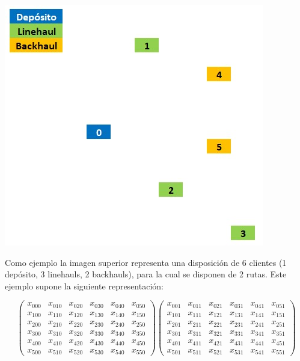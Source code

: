 \documentclass[letter, 10pt]{article}
\begin{document}
\begin{center}
\includegraphics[scale=0.5]{Instancia inicial.jpg}
\end{center}

Como ejemplo la imagen superior representa una disposición de $6$ clientes (1 depósito, 3 linehauls, 2 backhauls), para la cual se disponen de 2 rutas. Este ejemplo supone la siguiente representación:

\[ 
\left(
\begin{matrix}
 x_{000} &  x_{010} &  x_{020} &  x_{030} &  x_{040} &  x_{050}\\ 
 x_{100} &  x_{110} &  x_{120} &  x_{130} &  x_{140} &  x_{150}\\ 
 x_{200} &  x_{210} &  x_{220} &  x_{230} &  x_{240} &  x_{250}\\ 
 x_{300} &  x_{310} &  x_{320} &  x_{330} &  x_{340} &  x_{350}\\ 
 x_{400} &  x_{410} &  x_{420} &  x_{430} &  x_{440} &  x_{450}\\ 
 x_{500} &  x_{510} &  x_{520} &  x_{530} &  x_{540} &  x_{550}
\end{matrix}
\right)
%
\left(
\begin{matrix}
 x_{001} &  x_{011} &  x_{021} &  x_{031} &  x_{041} &  x_{051}\\ 
 x_{101} &  x_{111} &  x_{121} &  x_{131} &  x_{141} &  x_{151}\\ 
 x_{201} &  x_{211} &  x_{221} &  x_{231} &  x_{241} &  x_{251}\\ 
 x_{301} &  x_{311} &  x_{321} &  x_{331} &  x_{341} &  x_{351}\\ 
 x_{401} &  x_{411} &  x_{421} &  x_{431} &  x_{441} &  x_{451}\\ 
 x_{501} &  x_{511} &  x_{521} &  x_{531} &  x_{541} &  x_{551}
\end{matrix}
\right)
\]
\end{document}
